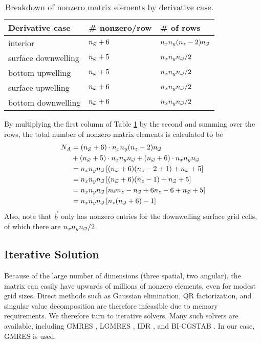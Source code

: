 \begin{table}[H]
  \centering
  \caption{Breakdown of nonzero matrix elements by derivative case.}
  \begin{tabular}{p{}p{}p{}}
    \toprule
    \textbf{Derivative case} & \textbf{\# nonzero/row} & \textbf{\# of rows} \\
    \midrule
    interior & ${n_{\vec{\omega}}}+6$ & $n_xn_y(n_z-2){n_{\vec{\omega}}}$ \\
    surface downwelling & ${n_{\vec{\omega}}}+5$ & $n_xn_y{n_{\vec{\omega}}}/2$ \\
    bottom upwelling & ${n_{\vec{\omega}}}+5$ & $n_xn_y{n_{\vec{\omega}}}/2$ \\
    surface upwelling & ${n_{\vec{\omega}}}+6$ & $n_xn_y{n_{\vec{\omega}}}/2$ \\
    bottom downwelling & ${n_{\vec{\omega}}}+6$ & $n_xn_y{n_{\vec{\omega}}}/2$ \\
    \bottomrule
  \end{tabular}
  \label{tab:nonzero}
\end{table}

By multiplying the first column of Table \ref{tab:nonzero} by the second and summing over the rows, the total number of nonzero matrix elements is calculated to be
\begin{align*}
  N_A &= ({n_{\vec{\omega}}}+6) \cdot n_xn_y(n_z-2){n_{\vec{\omega}}} \\
    &+   ({n_{\vec{\omega}}}+5) \cdot n_xn_y{n_{\vec{\omega}}}
    +   ({n_{\vec{\omega}}}+6) \cdot n_xn_y{n_{\vec{\omega}}} \\
  &= n_x n_y {n_{\vec{\omega}}} \left[({n_{\vec{\omega}}}+6)(n_z-2+1)+{n_{\vec{\omega}}}+5 \right] \\
  &= n_x n_y {n_{\vec{\omega}}} \left[({n_{\vec{\omega}}}+6)(n_z-1)+{n_{\vec{\omega}}}+5 \right] \\
  &=  n_x n_y {n_{\vec{\omega}}} \left[n\omega n_z -{n_{\vec{\omega}}} + 6n_z - 6 + {n_{\vec{\omega}}} + 5 \right] \\
  &=  n_x n_y {n_{\vec{\omega}}} \left[n_z({n_{\vec{\omega}}}+6)-1\right]
\end{align*}
Also, note that $\vec{b}$ only has nonzero entries for the downwelling surface grid cells, of which there are $n_x n_y {n_{\vec{\omega}}}/2$.

\subsection{Iterative Solution}
Because of the large number of dimensions (three spatial, two angular), the matrix can easily have upwards of millions of nonzero elements,
even for modest grid sizes.
Direct methods such as Gaussian elimination, QR factorization, and singular value decomposition are therefore infeasible due to memory requirements.
We therefore turn to iterative solvers.
Many such solvers are available, including GMRES \cite{saad_gmres:_1985}, LGMRES \cite{baker_technique_2005}, IDR \cite{sonneveld_idrs:_2008}, and BI-CGSTAB \cite{van_der_vorst_bi-cgstab:_1992}.
In our case, GMRES is used.
